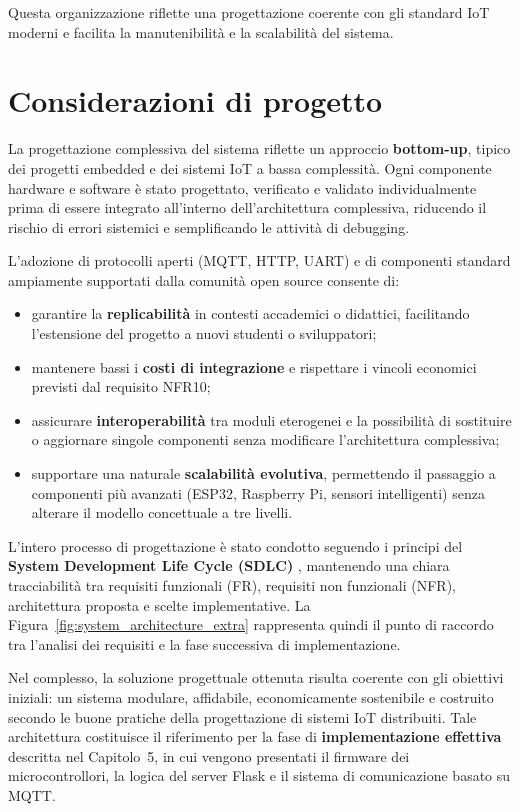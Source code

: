 Questa organizzazione riflette una progettazione coerente con gli standard IoT moderni e facilita la manutenibilità e la scalabilità del sistema.




\section{Considerazioni di progetto}

La progettazione complessiva del sistema riflette un approccio \textbf{bottom-up}, tipico dei progetti embedded e dei sistemi IoT a bassa complessità.
Ogni componente hardware e software è stato progettato, verificato e validato individualmente prima di essere integrato all’interno dell’architettura complessiva, riducendo il rischio di errori sistemici e semplificando le attività di debugging.

L’adozione di protocolli aperti (MQTT, HTTP, UART) e di componenti standard ampiamente supportati dalla comunità open source consente di:

\begin{itemize}
\item garantire la \textbf{replicabilità} in contesti accademici o didattici, facilitando l’estensione del progetto a nuovi studenti o sviluppatori;
\item mantenere bassi i \textbf{costi di integrazione} e rispettare i vincoli economici previsti dal requisito NFR10;
\item assicurare \textbf{interoperabilità} tra moduli eterogenei e la possibilità di sostituire o aggiornare singole componenti senza modificare l’architettura complessiva;
\item supportare una naturale \textbf{scalabilità evolutiva}, permettendo il passaggio a componenti più avanzati (ESP32, Raspberry Pi, sensori intelligenti) senza alterare il modello concettuale a tre livelli.
\end{itemize}

L’intero processo di progettazione è stato condotto seguendo i principi del \textbf{System Development Life Cycle (SDLC)} \cite{Pressman2019}, mantenendo una chiara tracciabilità tra requisiti funzionali (FR), requisiti non funzionali (NFR), architettura proposta e scelte implementative.
La Figura~\ref{fig:system_architecture_extra} rappresenta quindi il punto di raccordo tra l’analisi dei requisiti e la fase successiva di implementazione.

Nel complesso, la soluzione progettuale ottenuta risulta coerente con gli obiettivi iniziali: un sistema modulare, affidabile, economicamente sostenibile e costruito secondo le buone pratiche della progettazione di sistemi IoT distribuiti.
Tale architettura costituisce il riferimento per la fase di \textbf{implementazione effettiva} descritta nel Capitolo~5, in cui vengono presentati il firmware dei microcontrollori, la logica del server Flask e il sistema di comunicazione basato su MQTT.